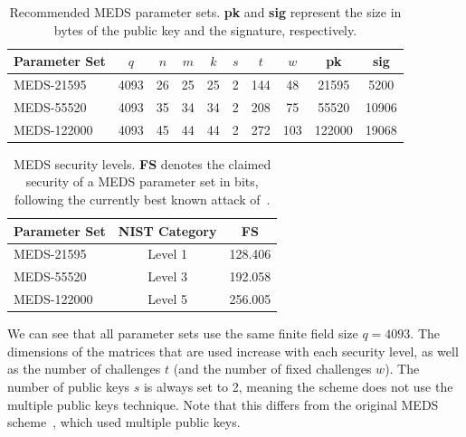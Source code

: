\documentclass[11pt,a4paper]{report}
\theoremstyle{definition}
\begin{document}
\begin{table}
  \centering
  \caption{Recommended MEDS parameter sets. \textbf{pk} and \textbf{sig} represent the size in bytes of the public key and the signature, respectively.}
  \begin{tabular}{lccccccccc}
    \toprule
    \textbf{Parameter Set} & \textbf{$q$} & \textbf{$n$} & \textbf{$m$} & \textbf{$k$} & \textbf{$s$} & \textbf{$t$} & \textbf{$w$} & \textbf{pk} & \textbf{sig} \\
    \midrule
    MEDS-21595             & 4093         & 26           & 25           & 25           & 2            & 144          & 48           & 21595       & 5200         \\
    MEDS-55520             & 4093         & 35           & 34           & 34           & 2            & 208          & 75           & 55520       & 10906        \\
    MEDS-122000            & 4093         & 45           & 44           & 44           & 2            & 272          & 103          & 122000      & 19068        \\
    \bottomrule
  \end{tabular}
  \label{tab:medsparametersets}
\end{table}

\begin{table}
  \centering
  \caption{MEDS security levels. \textbf{FS} denotes the claimed security of a MEDS parameter set in bits, following the currently best known attack of~\cite{kumar2024algorithms}.}
  \begin{tabular}{lcc}
    \toprule
    \textbf{Parameter Set} & \textbf{NIST Category} & \textbf{FS} \\
    \midrule
    MEDS-21595             & Level 1                & 128.406     \\
    MEDS-55520             & Level 3                & 192.058     \\
    MEDS-122000            & Level 5                & 256.005     \\
    \bottomrule
  \end{tabular}
  \label{tab:medssecuritylevels}
\end{table}

We can see that all parameter sets use the same finite field size $q = 4093$. The dimensions of the matrices that are used increase with each security level, as well as the number of challenges $t$ (and the number of fixed challenges $w$). The number of public keys $s$ is always set to 2, meaning the scheme does not use the multiple public keys technique. Note that this differs from the original MEDS scheme~\cite{chou2023meds}, which used multiple public keys.
\end{document}
